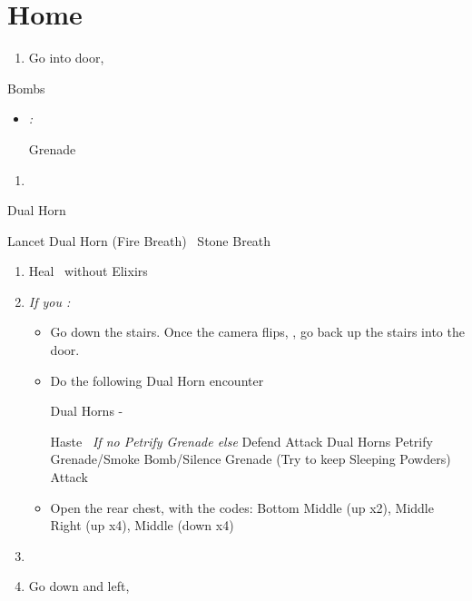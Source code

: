 \chapter{Home}

\begin{enumerate}
	\item Go into door, \sd
\end{enumerate}
\begin{battle}{Bombs}
	\begin{itemize}
		\tidusf Haste \tidus
		\tidusf Attach each, starting with Guado
		\auronf Attack Guado didn't die to \tidus
		\item \textit{\blitzloss:}
		      \begin{itemize}
			      \rikkuf Grenade
		      \end{itemize}
	\end{itemize}
\end{battle}
\begin{enumerate}[resume]
	\item \sd
\end{enumerate}
\begin{battle}{Dual Horn}
	\begin{itemize}
		\switch{anyone}{\kimahri}
		\kimahrif Lancet Dual Horn (Fire Breath)
		\kimahrif \od\ Stone Breath
	\end{itemize}
\end{battle}
\begin{enumerate}[resume]
	\item Heal \tidus\ without Elixirs
	\item \textit{If you \lostblitz:}
	      \begin{itemize}
		      \item Go down the stairs. Once the camera flips, \formation{\tidus}{\rikku}{\auron}, go back up the stairs into the door.
		      \item Do the following Dual Horn encounter
		            \begin{battle}{Dual Horns - \blitzloss}
			            \begin{itemize}
				            \tidusf Haste \tidus\ \textit{If no Petrify Grenade else } Defend
				            \tidusf Attack Dual Horns
				             Petrify Grenade/Smoke Bomb/Silence Grenade (Try to keep Sleeping Powders)
				            \tidusf Attack
			            \end{itemize}
		            \end{battle}
		      \item Open the rear chest, with the codes: Bottom Middle (up x2), Middle Right (up x4), Middle (down x4) %
	      \end{itemize}
	\item \formation{\tidus}{\lulu}{\auron}
	\item Go down and left, \cs[0:50]
\end{enumerate}
